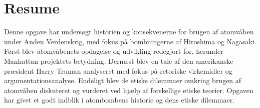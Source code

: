 \section{Resume}
Denne opgave har undersøgt historien og konsekvenerne for brugen af atomvåben under Anden Verdenskrig, med fokus på bombningerne af Hiroshima og Nagasaki. Først blev atomvåbenets opdagelse og udvikling redegjort for, herunder Manhattan projektets betydning. Dernæst blev en tale af den amerikanske præsident Harry Truman analyseret med fokus på retoriske virkemidler og argumentationsanalyse. Endeligt blev de etiske dilemmaer omkring brugen af atomvåben diskuteret og vurderet ved hjælp af forskellige etiske teorier. Opgaven har givet et godt indblik i atombombens historie og dens etiske dilemmaer.
\newpage
